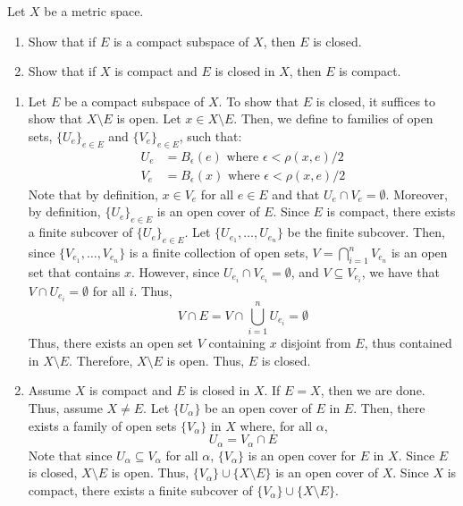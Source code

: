 \documentclass[12pt]{article}
\begin{document}
\newpage

\begin{problab}{2}
    Let $X$ be a metric space. 
    \begin{enumerate}
        \item Show that if $E$ is a compact subspace of $X$, then $E$ is closed. 
        \item Show that if $X$ is compact and $E$ is closed in $X$, then $E$ is compact.
    \end{enumerate}
\end{problab}
\begin{solu}
    \bbni
    \begin{enumerate}
        \item Let $E$ be a compact subspace of $X$. To show that $E$ is closed, it suffices to show that $X \setminus E$ is open. Let $x \in X \setminus E$. Then, we define to families of open sets, $\{U_e\}_{e \in E}$ and $\{V_e\}_{e \in E}$, such that:
        \begin{align*}
            U_e &= B_{\epsilon}(e) \text{ where } \epsilon < \rho(x,e)/2 \\
            V_e &= B_{\epsilon}(x) \text{ where } \epsilon < \rho(x,e)/2
        \end{align*} 
        Note that by definition, $x \in V_e$ for all $e \in E$ and that $U_e \cap V_e = \emptyset$. Moreover, by definition, $\{U_e\}_{e\in E}$ is an open cover of $E$. Since $E$ is compact, there exists a finite subcover of $\{U_e\}_{e \in E}$. Let $\{U_{e_1}, \ldots, U_{e_n}\}$ be the finite subcover. Then, since $\{V_{e_1}, \ldots, V_{e_n}\}$ is a finite collection of open sets, $V = \bigcap_{i=1}^n V_{e_n}$ is an open set that contains $x$. However, since $U_{e_i} \cap V_{e_i} = \emptyset$, and $V \subseteq V_{e_i}$, we have that $V \cap U_{e_i} = \emptyset$ for all $i$. Thus,
        \[  V \cap E = V \cap \bigcup_{i=1}^n U_{e_i} = \emptyset\]
        Thus, there exists an open set $V$ containing $x$ disjoint from $E$, thus contained in $X \setminus E$. Therefore, $X \setminus E$ is open. Thus, $E$ is closed.
        \item Assume $X$ is compact and $E$ is closed in $X$. If $E = X$, then we are done. Thus, assume $X \neq E$. Let $\{U_\alpha\}$ be an open cover of $E$ in $E$. Then, there exists a family of open sets $\{V_\alpha\}$ in $X$ where, for all $\alpha$,
        \[ U_\alpha = V_\alpha \cap E \]
        Note that since $U_\alpha \subseteq V_\alpha$ for all $\alpha$, $\{V_\alpha\}$ is an open cover for $E$ in $X$. Since $E$ is closed, $X \setminus E$ is open. Thus, $\{V_\alpha\} \cup \{X \setminus E\}$ is an open cover of $X$. Since $X$ is compact, there exists a finite subcover of $\{V_\alpha\} \cup \{X \setminus E\}$. \bbni 

\end{enumerate}
\end{solu}
\end{document}
